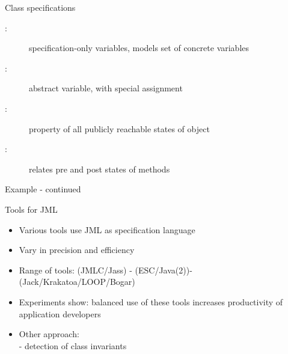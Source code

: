 \documentclass[final,nocolorBG,a4,marieke,nototal,pdf, accumulate,slideColor]{prosper}
\newcommand{\textttbf}[1]{\texttt{\textbf{#1}}}
\begin{document}
\begin{slide}{Class specifications}
\begin{description}
\item[:] specification-only variables, models set of
concrete variables
\item[:] abstract variable, with special assignment \Blue{\textttbf{set}}
\item[:] property of all publicly reachable states
of object 
\item[:] relates pre and post states of methods

\end{description}
\end{slide}


\begin{slide}{Example - continued}
{\small \begin{alltt}
\textbf{
}
\end{alltt}}
\end{slide}



\begin{slide}{Tools for JML}
\begin{itemize}
\item Various tools use JML as specification language
\item Vary in precision and efficiency
\item Range of tools:  (JMLC/Jass) -  (ESC/Java(2))- 
 (Jack/Krakatoa/LOOP/Bogar)
\item Experiments show: balanced use of these tools increases
productivity of application developers   
\item Other approach: \\
  - detection of class invariants
\end{itemize}
\end{slide}
\end{document}
